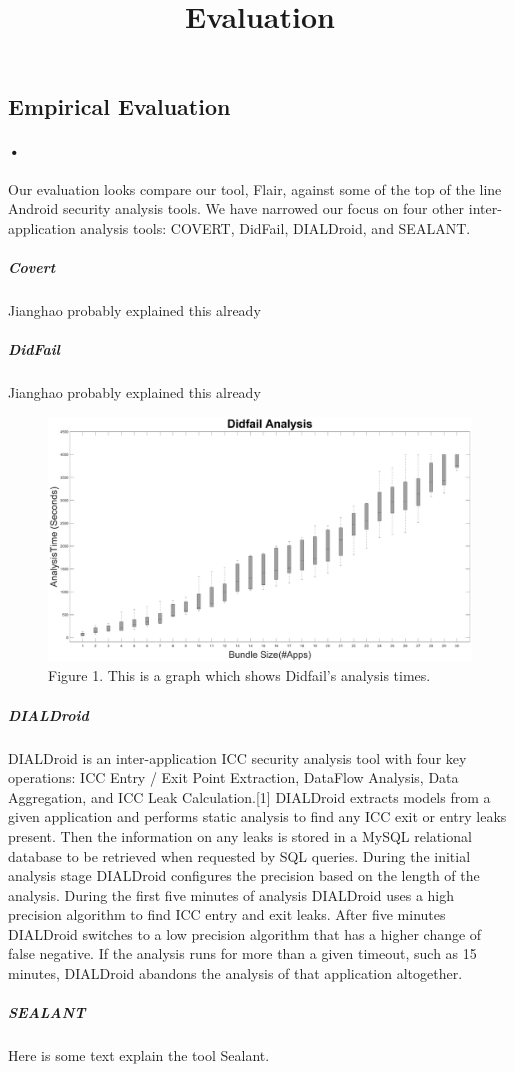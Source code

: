 \documentclass[twocolumn]{article}
\title{Evaluation}
\begin{document}
\begin{center}
\section*{Empirical Evaluation}
\end{center}


\paragraph{•}
	Our evaluation looks compare our tool, Flair, against some of the top of the line Android security analysis tools. We have narrowed our focus on four other inter-application analysis tools: COVERT, DidFail, DIALDroid, and SEALANT. 
	
	\subparagraph{Covert}
		Jianghao probably explained this already
	\subparagraph{DidFail}
		Jianghao probably explained this already


		\begin{figure}[h]
			\includegraphics[width=\linewidth]{DidfailBoxPlot}
			\caption{Figure 1. This is a graph which shows Didfail's analysis times.}
		\end{figure}

	
	\subparagraph{DIALDroid}
		DIALDroid is an inter-application ICC security analysis tool with four key operations: ICC Entry / Exit Point Extraction, DataFlow Analysis, Data Aggregation, and ICC Leak Calculation.[1] DIALDroid extracts models from a given application and performs static analysis to find any ICC exit or entry leaks present. Then the information on any leaks is stored in a MySQL relational database to be retrieved when requested by SQL queries. During the initial analysis stage DIALDroid configures the precision based on the length of the analysis. During the first five minutes of analysis DIALDroid uses a high precision algorithm to find ICC entry and exit leaks. After five minutes DIALDroid switches to a low precision algorithm that has a higher change of false negative. If the analysis runs for more than a given timeout, such as 15 minutes, DIALDroid abandons the analysis of that application altogether.
	\subparagraph{SEALANT}
		Here is some text explain the tool Sealant.
\end{document}
